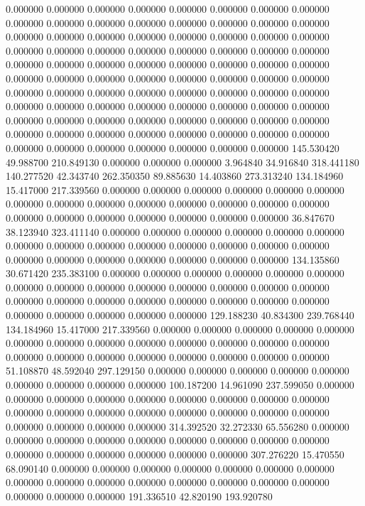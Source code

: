0.000000 0.000000 0.000000
0.000000 0.000000 0.000000
0.000000 0.000000 0.000000
0.000000 0.000000 0.000000
0.000000 0.000000 0.000000
0.000000 0.000000 0.000000
0.000000 0.000000 0.000000
0.000000 0.000000 0.000000
0.000000 0.000000 0.000000
0.000000 0.000000 0.000000
0.000000 0.000000 0.000000
0.000000 0.000000 0.000000
0.000000 0.000000 0.000000
0.000000 0.000000 0.000000
0.000000 0.000000 0.000000
0.000000 0.000000 0.000000
0.000000 0.000000 0.000000
0.000000 0.000000 0.000000
0.000000 0.000000 0.000000
0.000000 0.000000 0.000000
0.000000 0.000000 0.000000
0.000000 0.000000 0.000000
0.000000 0.000000 0.000000
0.000000 0.000000 0.000000
0.000000 0.000000 0.000000
0.000000 0.000000 0.000000
0.000000 0.000000 0.000000
0.000000 0.000000 0.000000
0.000000 0.000000 0.000000
145.530420 49.988700 210.849130
0.000000 0.000000 0.000000
3.964840 34.916840 318.441180
140.277520 42.343740 262.350350
89.885630 14.403860 273.313240
134.184960 15.417000 217.339560
0.000000 0.000000 0.000000
0.000000 0.000000 0.000000
0.000000 0.000000 0.000000
0.000000 0.000000 0.000000
0.000000 0.000000 0.000000
0.000000 0.000000 0.000000
0.000000 0.000000 0.000000
36.847670 38.123940 323.411140
0.000000 0.000000 0.000000
0.000000 0.000000 0.000000
0.000000 0.000000 0.000000
0.000000 0.000000 0.000000
0.000000 0.000000 0.000000
0.000000 0.000000 0.000000
0.000000 0.000000 0.000000
134.135860 30.671420 235.383100
0.000000 0.000000 0.000000
0.000000 0.000000 0.000000
0.000000 0.000000 0.000000
0.000000 0.000000 0.000000
0.000000 0.000000 0.000000
0.000000 0.000000 0.000000
0.000000 0.000000 0.000000
0.000000 0.000000 0.000000
0.000000 0.000000 0.000000
129.188230 40.834300 239.768440
134.184960 15.417000 217.339560
0.000000 0.000000 0.000000
0.000000 0.000000 0.000000
0.000000 0.000000 0.000000
0.000000 0.000000 0.000000
0.000000 0.000000 0.000000
0.000000 0.000000 0.000000
0.000000 0.000000 0.000000
51.108870 48.592040 297.129150
0.000000 0.000000 0.000000
0.000000 0.000000 0.000000
0.000000 0.000000 0.000000
100.187200 14.961090 237.599050
0.000000 0.000000 0.000000
0.000000 0.000000 0.000000
0.000000 0.000000 0.000000
0.000000 0.000000 0.000000
0.000000 0.000000 0.000000
0.000000 0.000000 0.000000
0.000000 0.000000 0.000000
314.392520 32.272330 65.556280
0.000000 0.000000 0.000000
0.000000 0.000000 0.000000
0.000000 0.000000 0.000000
0.000000 0.000000 0.000000
0.000000 0.000000 0.000000
307.276220 15.470550 68.090140
0.000000 0.000000 0.000000
0.000000 0.000000 0.000000
0.000000 0.000000 0.000000
0.000000 0.000000 0.000000
0.000000 0.000000 0.000000
0.000000 0.000000 0.000000
191.336510 42.820190 193.920780
